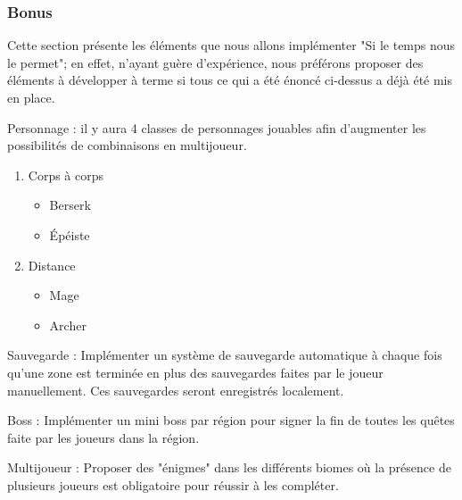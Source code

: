 \documentclass[12pt]{article}
\begin{document}
            \subsubsection{Bonus}
                Cette section présente les éléments que nous allons implémenter "Si le temps nous le permet"; en effet, n'ayant guère d'expérience, nous préférons proposer des éléments à développer à terme si tous ce qui a été énoncé ci-dessus a déjà été mis en place.
                \\
                \par Personnage : il y aura 4 classes de personnages jouables afin d'augmenter les possibilités de combinaisons en multijoueur.
                \begin{enumerate}
                \setlength{\itemindent}{2em}
                    \item Corps à corps
                    \begin{itemize}
                        \item Berserk
                        \item Épéiste
                    \end{itemize}
                    \item Distance
                    \begin{itemize}
                        \item Mage
                        \item Archer
                    \end{itemize}
                \end{enumerate} 
                
                \par Sauvegarde : Implémenter un système de sauvegarde automatique à chaque fois qu'une zone est terminée en plus des sauvegardes faites par le joueur manuellement.
                Ces sauvegardes seront enregistrés localement.
                \\
                \par Boss : Implémenter un mini boss par région pour signer la fin de toutes les quêtes faite par les joueurs dans la région.
                \\
                \par Multijoueur : Proposer des "énigmes" dans les différents biomes où la présence de plusieurs joueurs est obligatoire pour réussir à les compléter.
                \\
                
\end{document}
